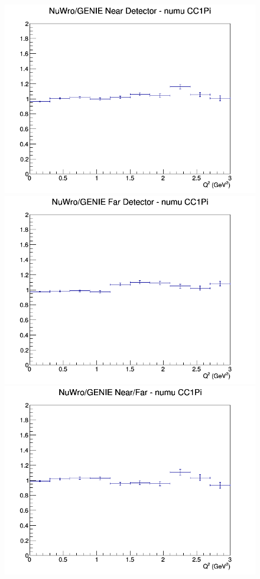 \documentclass[12pt]{article}
\begin{document}
\begin{figure}[h]
\endminipage
\newline
{}
\includegraphics[width=\linewidth]{eff_Q2/GAr/ratios/CC1Pi_NuWro_GENIE_numu_near_Q2.png}
\endminipage
{}
\includegraphics[width=\linewidth]{eff_Q2/GAr/ratios/CC1Pi_NuWro_GENIE_numu_far_Q2.png}
\endminipage
{}
\includegraphics[width=\linewidth]{eff_Q2/GAr/ratios/CC1Pi_NuWro_GENIE_numu_NF_Q2.png}
\endminipage
\newline
\end{figure}
\clearpage
\end{document}
